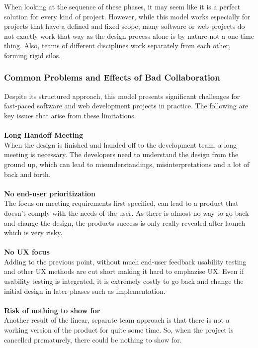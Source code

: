 When looking at the sequence of these phases, it may seem like it is a perfect solution for every kind
of project. However, while this model works especially for projects that have a defined and fixed
scope, many software or web projects do not exactly work that way as the design process alone is by
nature not a one-time thing. Also, teams of different disciplines work separately from each other,
forming rigid silos. 

\subsubsection{Common Problems and Effects of Bad Collaboration}
Despite its structured approach, this model presents significant challenges for fast-paced software
and web development projects in practice. The following are key issues that arise from these
limitations.\\\\
\textbf{Long Handoff Meeting} \\
When the design is finished and handed off to the development team, a long meeting is necessary. The
developers need to understand the design from the ground up, which can lead to misunderstandings,
misinterpretations and a lot of back and forth.\\\\
\textbf{No end-user prioritization} \\
The focus on meeting requirements first specified, can lead to a product that doesn't comply with
the needs of the user. As there is almost no way to go back and change the design, the products 
success is only really revealed after launch which is very risky.\\\\
\textbf{No UX focus} \\
Adding to the previous point, without much end-user feedback usability testing and other UX methods
are cut short making it hard to emphazise UX. Even if usability testing is integrated, it is
extremely costly to go back and change the initial design in later phases such as
implementation.\\\\ 
\textbf{Risk of nothing to show for} \\
Another result of the linear, separate team approach is that there is not a working version of the
product for quite some time. So, when the project is cancelled prematurely, there could be nothing
to show for.\\
